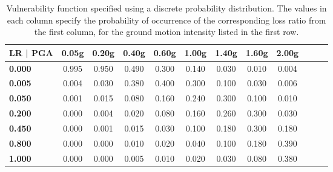 \begin{table}[htbp]

\centering
\begin{tabular}{ l c c c c c c c c c c c}

\hline
\rowcolor{anti-flashwhite}
\bf{LR | PGA} & \bf{0.05g} & \bf{0.20g} & \bf{0.40g} & \bf{0.60g} & \bf{1.00g} & \bf{1.40g} & \bf{1.60g} & \bf{2.00g} \\
\hline
\bf{0.000} & 0.995 & 0.950 & 0.490 & 0.300 & 0.140 & 0.030 & 0.010 & 0.004 \\
\bf{0.005} & 0.004 & 0.030 & 0.380 & 0.400 & 0.300 & 0.100 & 0.030 & 0.006 \\
\bf{0.050} & 0.001 & 0.015 & 0.080 & 0.160 & 0.240 & 0.300 & 0.100 & 0.010 \\
\bf{0.200} & 0.000 & 0.004 & 0.020 & 0.080 & 0.160 & 0.260 & 0.300 & 0.030 \\
\bf{0.450} & 0.000 & 0.001 & 0.015 & 0.030 & 0.100 & 0.180 & 0.300 & 0.180 \\
\bf{0.800} & 0.000 & 0.000 & 0.010 & 0.020 & 0.040 & 0.100 & 0.180 & 0.390 \\
\bf{1.000} & 0.000 & 0.000 & 0.005 & 0.010 & 0.020 & 0.030 & 0.080 & 0.380 \\
\hline
\end{tabular}

\caption{Vulnerability function specified using a discrete probability distribution. The values in each column specify the probability of occurrence of the corresponding loss ratio from the first column, for the ground motion intensity listed in the first row.}
\label{tab:vf-pm-tax1}
\end{table}

